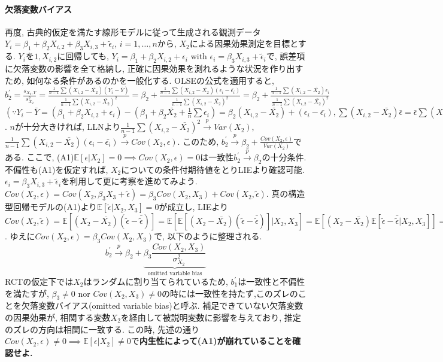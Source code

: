 \documentclass[paper=a4paper,fontsize=10pt]{jlreq}
\begin{document}
\paragraph{欠落変数バイアス}
再度, 古典的仮定を満たす線形モデルに従って生成される観測データ$Y_i=\beta_1+\beta_2X_{i,2}+\beta_3X_{i,3}+\tilde{\epsilon}_i$, $i=1,\dots,n$から, $X_2$による因果効果測定を目標とする. $Y_i$を$1, X_{i,2}$に回帰しても, $Y_i=\beta_1+\beta_2X_{i,2}+\epsilon_i$ with $\epsilon_i=\beta_3X_{i,3}+\tilde{\epsilon}_i$で, 誤差項に欠落変数の影響を全て格納し, 正確に因果効果を測れるような状況を作り出すため, 如何なる条件があるのかを一般化する. OLSEの公式を適用すると, $b_2^\prime =\frac{s_{X_2,Y}}{s_{X_2}^2}=\frac{\frac{1}{n-1}\sum{(X_{i,2}-\bar{X_{2}})(Y_{i}-\bar{Y})}}{\frac{1}{n-1}\sum{(X_{i,2}-\bar{X_{2}})^2}}=\beta_2+\frac{\frac{1}{n-1}\sum{(X_{i,2}-\bar{X_{2}})(\epsilon_i-\bar{\epsilon_i})}}{\frac{1}{n-1}\sum{(X_{i,2}-\bar{X_{2}})^2}}=\beta_2+\frac{\frac{1}{n-1}\sum{(X_{i,2}-\bar{X_{2}})\epsilon_i}}{\frac{1}{n-1}\sum{(X_{i,2}-\bar{X_{2}})^2}}$ $(\because Y_{i}-\bar{Y}=(\beta_1+\beta_2X_{i,2}+\epsilon_i)-(\beta_1+{\beta_2}\bar{X_{2}}+\frac{1}{n}\sum{\epsilon_i})={\beta_2}(X_{i,2}-\bar{X_{2}})+(\epsilon_i-\bar{\epsilon_i}), \sum{(X_{i,2}-\bar{X_{2}})\bar{\epsilon}}=\bar{\epsilon}\sum{(X_{i,2}-\bar{X_{2}})}=0)$. $n$が十分大きければ, LLNより$\frac{1}{n-1}\sum{(X_{i,2}-\bar{X_{2}})^2} \overset{p}{\to} Var(X_2)$, $\frac{1}{n-1}\sum{(X_{i,2}-\bar{X_{2}})(\epsilon_i-\bar{\epsilon_i})} \overset{p}{\to} Cov(X_2, \epsilon)$. このため, $b_2^\prime \overset{p}{\to} \beta_2+\frac{Cov(X_2, \epsilon)}{Var(X_2)}$である. ここで, (A1)$\mathbb{E}[\epsilon | X_{2}]=0 \implies Cov(X_2, \epsilon) = 0$は一致性$b_2^\prime \overset{p}{\to} \beta_2$の十分条件. 不偏性も(A1)を仮定すれば, $X_{2}$についての条件付期待値をとりLIEより確認可能. $\epsilon_i=\beta_3X_{i,3}+\tilde{\epsilon}_i$を利用して更に考察を進めてみよう. $Cov(X_2, \epsilon)=Cov(X_2, \beta_3X_{3}+\tilde{\epsilon})=\beta_3Cov(X_2, X_{3})+Cov(X_2, \tilde{\epsilon})$. 真の構造型回帰モデルの(A1)より$\mathbb{E}[\tilde{\epsilon} | X_{2}, X_{3}]=0$が成立し, LIEより$Cov(X_2, \tilde{\epsilon})=\mathbb{E}[(X_2-\bar{X_2})(\tilde{\epsilon}-\bar{\tilde{\epsilon}})]=\mathbb{E}[\mathbb{E}[(X_2-\bar{X_2})(\tilde{\epsilon}-\bar{\tilde{\epsilon}})]|X_{2}, X_{3}]=\mathbb{E}[(X_2-\bar{X_2})\mathbb{E}[\tilde{\epsilon}-\bar{\tilde{\epsilon}}|X_{2}, X_{3}]]=0$. ゆえに$Cov(X_2, \epsilon)=\beta_3Cov(X_2, X_{3})$で, 以下のように整理される.
\begin{equation*}
  b_2^\prime \overset{p}{\to} \beta_2+ \underset{\text{omitted variable bias}}{\underbrace{\beta_3\frac{Cov(X_2, X_3)}{\sigma_{X_2}^2}}}
\end{equation*}
RCTの仮定下では$X_2$はランダムに割り当てられているため, $b_1^\prime$は一致性と不偏性を満たすが, $\beta_3 \neq 0 \text{ nor } Cov(X_2, X_{3})\neq 0$の時には一致性を持たず,このズレのことを欠落変数バイアス(omitted variable bias)と呼ぶ. 補足できていない欠落変数の因果効果が, 相関する変数$X_2$を経由して被説明変数に影響を与えており, 推定のズレの方向は相関に一致する. この時, 先述の通り$ Cov(X_2, \epsilon) \neq 0 \implies \mathbb{E}[\epsilon | X_{2}] \neq 0$で\rmfamily\mcfamily\bfseries{内生性}\mdseries によって(A1)が崩れていることを確認せよ.\\
\end{document}
